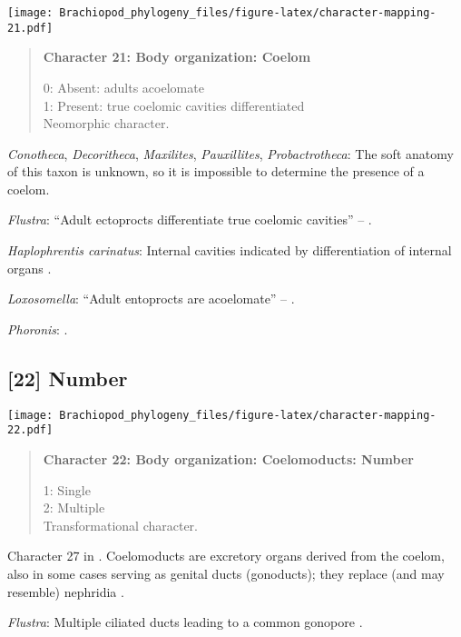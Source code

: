 \documentclass[openany]{book}
\theoremstyle{definition}
\theoremstyle{definition}
\theoremstyle{definition}
\theoremstyle{remark}
\begin{document}
\texttt{[image: Brachiopod\_phylogeny\_files/figure-latex/character-mapping-21.pdf]}

\begin{quote}
\textbf{Character 21: Body organization: Coelom}

0: Absent: adults acoelomate\\
1: Present: true coelomic cavities differentiated\\
Neomorphic character.
\end{quote}

\hypertarget{Conotheca-coding-21}{}
\emph{Conotheca}, \emph{Decoritheca}, \emph{Maxilites},
\emph{Pauxillites}, \emph{Probactrotheca}: The soft anatomy of this
taxon is unknown, so it is impossible to determine the presence of a
coelom.

\hypertarget{Flustra-coding-21}{}
\emph{Flustra}: ``Adult ectoprocts differentiate true coelomic
cavities'' -- \citet{Fuchs2008}.

\hypertarget{Haplophrentis_carinatus-coding-21}{}
\emph{Haplophrentis carinatus}: Internal cavities indicated by
differentiation of internal organs
\citep[see][]{Moysiuk2017Hyolithsare}.

\hypertarget{Loxosomella-coding-21}{}
\emph{Loxosomella}: ``Adult entoprocts are acoelomate'' --
\citet{Fuchs2008}.

\hypertarget{Phoronis-coding-21}{}
\emph{Phoronis}: \citet{Temereva2017Innervationof}.

\subsection*{{[}22{]} Number}\label{number-1}

\texttt{[image: Brachiopod\_phylogeny\_files/figure-latex/character-mapping-22.pdf]}

\begin{quote}
\textbf{Character 22: Body organization: Coelomoducts: Number}

1: Single\\
2: Multiple\\
Transformational character.
\end{quote}

Character 27 in \citet{Haszprunar2000}. Coelomoducts are excretory
organs derived from the coelom, also in some cases serving as genital
ducts (gonoducts); they replace (and may resemble) nephridia
\citep{Goodrich1945}.

\hypertarget{Flustra-coding-22}{}
\emph{Flustra}: Multiple ciliated ducts leading to a common gonopore
\citep{Goodrich1945}.
\end{document}
